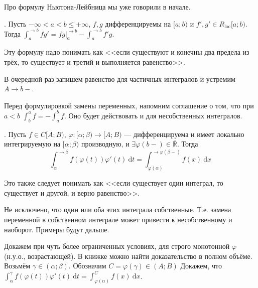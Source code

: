 \documentclass{article}
\begin{document}
\begin{itemize}
        \begin{Comment}
            Про формулу Ньютона-Лейбница мы уже говорили в начале.
        \end{Comment}
        \thm {}. Пусть $-\infty<a<b\leqslant+\infty$, $f,g$ дифференцируемы на $[a;b)$ и $f',g'\in R_{\mathrm{loc}}[a;b)$. Тогда $\int_a^{\to b}fg'=fg\big|_a^{\to b}-\int_a^{\to b}f'g$.
        \begin{Comment}
            Эту формулу надо понимать как <<если существуют и конечны два предела из трёх, то существует и третий и выполняется равенство>>.
        \end{Comment}
        \begin{Proof}
            В очередной раз запишем равенство для частичных интегралов и устремим $A\to b-$.
        \end{Proof}
        \begin{Comment}
            Перед формулировкой замены переменных, напомним соглашение о том, что при $a<b$ $\int_b^af=-\int_a^bf$. Оно будет действовать и для несобственных интегралов.
        \end{Comment}
        \thm {}. Пусть $f\in C[A;B)$, $\varphi\colon[\alpha;\beta)\to[A;B)$ --- дифференцируема и имеет локально интегрируемую на $[\alpha;\beta)$ производную, и $\exists\varphi(b-)\in\overline{\mathbb R}$. Тогда
        $$\int_\alpha^{\to\beta}f(\varphi(t))\varphi'(t)~\mathrm dt=\int_{\varphi(\alpha)}^{\to\varphi(\beta-)}f(x)~\mathrm dx$$
        \begin{Comment}
            Это также следует понимать как <<если существует один интеграл, то существует и другой, и верно равенство>>.
        \end{Comment}
        \begin{Comment}
            Не исключено, что один или оба этих интеграла собственные. Т.е. замена переменной в собственном интеграле может привести к несобственному и наоборот. Примеры будут дальше.
        \end{Comment}
        \begin{Proof}
            Докажем при чуть более ограниченных условиях, для строго монотонной $\varphi$ (н.у.о., возрастающей). В книжке можно найти доказательство в полном объёме.\\
            Возьмём $\gamma\in(\alpha;\beta)$. Обозначим $C=\varphi(\gamma)\in(A;B)$ Докажем, что $\int_\alpha^\gamma f(\varphi(t))\varphi'(t)~\mathrm dt=\int_{\varphi(\alpha)}^Cf(x)~\mathrm dx$.\\

\end{Proof}
\end{itemize}
\end{document}
